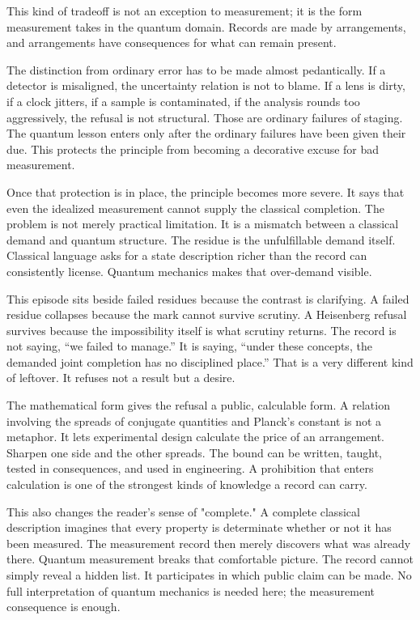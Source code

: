 This kind of tradeoff is not an exception to measurement; it is the form
measurement takes in the quantum domain. Records are made by arrangements, and
arrangements have consequences for what can remain present.

The distinction from ordinary error has to be made almost pedantically. If a
detector is misaligned, the uncertainty relation is not to blame. If a lens
is dirty, if a clock jitters, if a sample is contaminated, if the analysis
rounds too aggressively, the refusal is not structural. Those are ordinary
failures of staging. The quantum lesson enters only after the ordinary
failures have been given their due. This protects the principle from becoming
a decorative excuse for bad measurement.

Once that protection is in place, the principle becomes more severe. It says
that even the idealized measurement cannot supply the classical completion.
The problem is not merely practical limitation. It is a mismatch between a
classical demand and quantum structure. The residue is the unfulfillable
demand itself. Classical language asks for a state description richer than the
record can consistently license. Quantum mechanics makes that over-demand
visible.

This episode sits beside failed residues because the contrast is clarifying. A
failed residue collapses because the mark cannot survive scrutiny. A
Heisenberg refusal survives because the impossibility itself is what scrutiny
returns. The record is not saying, ``we failed to manage.'' It is saying, ``under
these concepts, the demanded joint completion has no disciplined place.'' That
is a very different kind of leftover. It refuses not a result but a desire.

The mathematical form gives the refusal a public, calculable form. A relation
involving the spreads of conjugate quantities and Planck's constant is not a
metaphor.
It lets experimental design calculate the price of an arrangement. Sharpen
one side and the other spreads. The bound can be written, taught, tested in
consequences, and used in engineering. A prohibition that enters calculation
is one of the strongest kinds of knowledge a record can carry.

This also changes the reader's sense of "complete." A complete classical
description imagines that every property is determinate whether or not it has
been measured. The measurement record then merely discovers what was already
there. Quantum measurement breaks that comfortable picture. The record cannot
simply reveal a hidden list. It participates in which public claim can be
made. No full interpretation of quantum mechanics is needed here; the
measurement consequence is enough.

